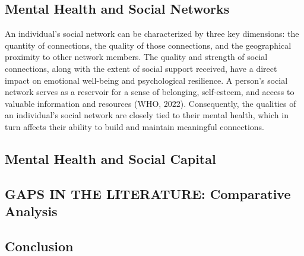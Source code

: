 \subsection{Mental Health and Social Networks}
    An individual's social network can be characterized by three key dimensions: the quantity of connections, the quality of those connections, and the geographical proximity to other network members. The quality and strength of social connections, along with the extent of social support received, have a direct impact on emotional well-being and psychological resilience. A person's social network serves as a reservoir for a sense of belonging, self-esteem, and access to valuable information and resources (WHO, 2022).
    Consequently, the qualities of an individual's social network are closely tied to their mental health, which in turn affects their ability to build and maintain meaningful connections. 

    




\subsection{Mental Health and Social Capital}












\subsection{GAPS IN THE LITERATURE: Comparative Analysis}


\subsection{Conclusion}





